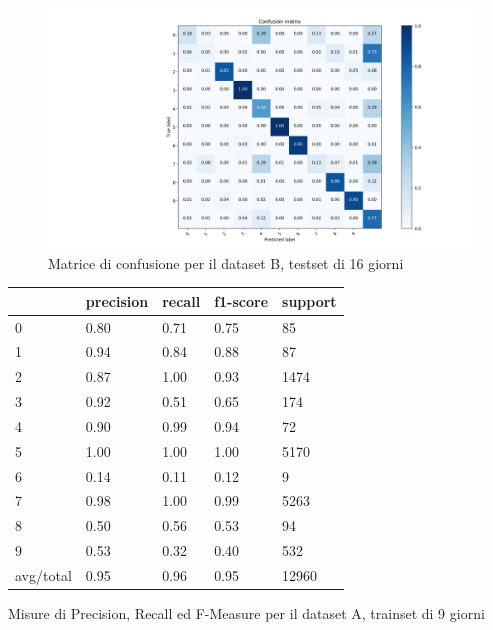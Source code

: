 \documentclass[10pt,a4paper]{article}
\begin{document}
	\begin{figure}[!htbp]
	\includegraphics[width=\linewidth]{immagini/confusion_matrix/b_16d.png}
	\caption{Matrice di confusione per il dataset B, testset di 16 giorni}
	\label{fig:b_16d}
	\end{figure}
	
	
	\begin{table}[!htbp]
    \scriptsize
    \centering
    	\begin{tabularx}{0.56\textwidth}{l | llll}
    		{} & {precision} & {recall} & {f1-score} & {support} \\
    		\midrule
            {0} & {0.80} & {0.71} & {0.75} & {85} \\
            {1} & {0.94} & {0.84} & {0.88} & {87} \\
            {2} & {0.87} & {1.00} & {0.93} & {1474} \\
            {3} & {0.92} & {0.51} & {0.65} & {174} \\
            {4} & {0.90} & {0.99} & {0.94} & {72} \\
            {5} & {1.00} & {1.00} & {1.00} & {5170} \\
            {6} & {0.14} & {0.11} & {0.12} & {9} \\
            {7} & {0.98} & {1.00} & {0.99} & {5263} \\
            {8} & {0.50} & {0.56} & {0.53} & {94} \\
            {9} & {0.53} & {0.32} & {0.40} & {532} \\
            {avg/total} & {0.95} & {0.96} & {0.95} & {12960} \\
    	\end{tabularx}
    	 {Misure di Precision, Recall ed F-Measure per il dataset A, trainset di 9 giorni}
    	\label{tab:a_9d}
    \end{table}
    
\end{document}

